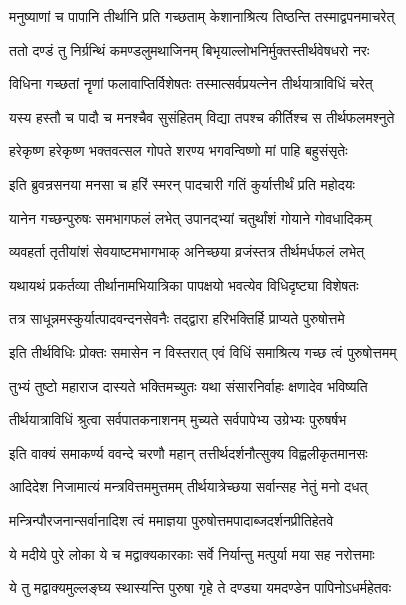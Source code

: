 \twolineshloka
{मनुष्याणां च पापानि तीर्थानि प्रति गच्छताम्}
{केशानाश्रित्य तिष्ठन्ति तस्माद्वपनमाचरेत्}%

\twolineshloka
{ततो दण्डं तु निर्ग्रन्थिं कमण्डलुमथाजिनम्}
{बिभृयाल्लोभनिर्मुक्तस्तीर्थवेषधरो नरः}%

\twolineshloka
{विधिना गच्छतां नॄणां फलावाप्तिर्विशेषतः}
{तस्मात्सर्वप्रयत्नेन तीर्थयात्राविधिं चरेत्}%

\twolineshloka
{यस्य हस्तौ च पादौ च मनश्चैव सुसंहितम्}
{विद्या तपश्च कीर्तिश्च स तीर्थफलमश्नुते}%

\twolineshloka
{हरेकृष्ण हरेकृष्ण भक्तवत्सल गोपते}
{शरण्य भगवन्विष्णो मां पाहि बहुसंसृतेः}%

\twolineshloka
{इति ब्रुवन्रसनया मनसा च हरिं स्मरन्}
{पादचारी गतिं कुर्यात्तीर्थं प्रति महोदयः}%

\twolineshloka
{यानेन गच्छन्पुरुषः समभागफलं लभेत्}
{उपानद्भ्यां चतुर्थांशं गोयाने गोवधादिकम्}%

\twolineshloka
{व्यवहर्ता तृतीयांशं सेवयाष्टमभागभाक्}
{अनिच्छया व्रजंस्तत्र तीर्थमर्धफलं लभेत्}%

\twolineshloka
{यथायथं प्रकर्तव्या तीर्थानामभियात्रिका}
{पापक्षयो भवत्येव विधिदृष्ट्या विशेषतः}%

\twolineshloka
{तत्र साधून्नमस्कुर्यात्पादवन्दनसेवनैः}
{तद्द्वारा हरिभक्तिर्हि प्राप्यते पुरुषोत्तमे}%

\twolineshloka
{इति तीर्थविधिः प्रोक्तः समासेन न विस्तरात्}
{एवं विधिं समाश्रित्य गच्छ त्वं पुरुषोत्तमम्}%

\twolineshloka
{तुभ्यं तुष्टो महाराज दास्यते भक्तिमच्युतः}
{यथा संसारनिर्वाहः क्षणादेव भविष्यति}%

\twolineshloka
{तीर्थयात्राविधिं श्रुत्वा सर्वपातकनाशनम्}
{मुच्यते सर्वपापेभ्य उग्रेभ्यः पुरुषर्षभ}%


\twolineshloka
{इति वाक्यं समाकर्ण्य ववन्दे चरणौ महान्}
{तत्तीर्थदर्शनौत्सुक्य विह्वलीकृतमानसः}%

\twolineshloka
{आदिदेश निजामात्यं मन्त्रवित्तममुत्तमम्}
{तीर्थयात्रेच्छया सर्वान्सह नेतुं मनो दधत्}%

\twolineshloka
{मन्त्रिन्पौरजनान्सर्वानादिश त्वं ममाज्ञया}
{पुरुषोत्तमपादाब्जदर्शनप्रीतिहेतवे}%

\twolineshloka
{ये मदीये पुरे लोका ये च मद्वाक्यकारकाः}
{सर्वे निर्यान्तु मत्पुर्या मया सह नरोत्तमाः}%

\twolineshloka
{ये तु मद्वाक्यमुल्लङ्घ्य स्थास्यन्ति पुरुषा गृहे}
{ते दण्ड्या यमदण्डेन पापिनोऽधर्महेतवः}%

